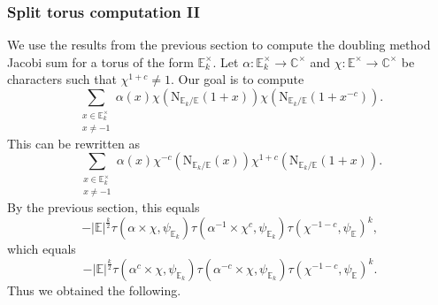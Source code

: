 \documentclass[12pt, reqno]{amsart}
\theoremstyle{definition}
\theoremstyle{definition}
\theoremstyle{definition}
\newcommand{\cComplex}{\mathbb{C}}
\newcommand{\multiplicativegroup}[1]{#1^{\times}}
\newcommand{\sizeof}[1]{\left|#1\right|}
\newcommand{\fieldCharacter}{\psi}
\newcommand{\involution}[1]{#1^{c}}
\newcommand{\minusInvolution}[1]{#1^{-c}}
\newcommand{\involutionPlusOne}[1]{#1^{1+c}}
\newcommand{\minusInvolutionMinusOne}[1]{#1^{-1-c}}
\newcommand{\aFieldNorm}{\mathrm{N}}
\newcommand{\quadraticExtension}{\mathbb{E}}
\newcommand{\quadraticFieldExtension}[1]{\quadraticExtension_{#1}}
\newcommand{\GaussSumSingleCharacter}[2]{\tau\left(#1, #2\right)}
\newcommand{\GaussSumCharacter}[3]{\tau\left(#1 \times #2, #3\right)}
\begin{document}
\subsubsection{Split torus computation II}
We use the results from the previous section to compute the doubling method Jacobi sum for a torus of the form $\multiplicativegroup{\quadraticFieldExtension{k}}$. Let $\alpha \colon \multiplicativegroup{\quadraticFieldExtension{k}} \to \multiplicativegroup{\cComplex}$ and $\chi \colon \multiplicativegroup{\quadraticExtension} \to \multiplicativegroup{\cComplex}$ be characters such that $\involutionPlusOne{\chi} \ne 1$. Our goal is to compute $$\sum_{\substack{x \in \multiplicativegroup{\quadraticFieldExtension{k}}\\
		x \ne -1}} \alpha \left(x\right) \chi\left(\aFieldNorm_{\quadraticFieldExtension{k} \slash \quadraticExtension}\left(1 + x\right)\right) \chi\left(\aFieldNorm_{\quadraticFieldExtension{k} \slash \quadraticExtension}\left(1 + \minusInvolution{x}\right)\right).$$
This can be rewritten as
$$\sum_{\substack{x \in \multiplicativegroup{\quadraticFieldExtension{k}}\\
		x \ne -1}} \alpha \left(x\right) \minusInvolution{\chi}\left(\aFieldNorm_{\quadraticFieldExtension{k} \slash \quadraticExtension}\left(x\right)\right) \involutionPlusOne{\chi}\left(\aFieldNorm_{\quadraticFieldExtension{k} \slash \quadraticExtension}\left(1 + x\right)\right).$$
By the previous section, this equals
\begin{equation*}
	-\sizeof{\quadraticExtension}^{\frac{k}{2}} \GaussSumCharacter{\alpha}{\chi}{\fieldCharacter_{\quadraticFieldExtension{k}}} \GaussSumCharacter{\alpha^{-1}}{\involution{\chi}}{\fieldCharacter_{\quadraticFieldExtension{k}}} \GaussSumSingleCharacter{\minusInvolutionMinusOne{\chi}}{\fieldCharacter_{\quadraticExtension}}^k,
\end{equation*}
which equals
\begin{equation*}
	-\sizeof{\quadraticExtension}^{\frac{k}{2}} \GaussSumCharacter{\involution{\alpha}}{\chi}{\fieldCharacter_{\quadraticFieldExtension{k}}} \GaussSumCharacter{\minusInvolution{\alpha}}{\chi}{\fieldCharacter_{\quadraticFieldExtension{k}}} \GaussSumSingleCharacter{\minusInvolutionMinusOne{\chi}}{\fieldCharacter_{\quadraticExtension}}^k.
\end{equation*}
Thus we obtained the following.
\end{document}
